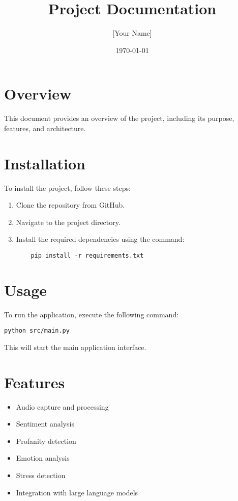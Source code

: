 \documentclass{article}
\title{Project Documentation}
\author{[Your Name]}
\date{\today}
\begin{document}
\maketitle

\section{Overview}
This document provides an overview of the project, including its purpose, features, and architecture.

\section{Installation}
To install the project, follow these steps:
\begin{enumerate}
    \item Clone the repository from GitHub.
    \item Navigate to the project directory.
    \item Install the required dependencies using the command:
    \begin{verbatim}
    pip install -r requirements.txt
    \end{verbatim}
\end{enumerate}

\section{Usage}
To run the application, execute the following command:
\begin{verbatim}
python src/main.py
\end{verbatim}
This will start the main application interface.

\section{Features}
\begin{itemize}
    \item Audio capture and processing
    \item Sentiment analysis
    \item Profanity detection
    \item Emotion analysis
    \item Stress detection
    \item Integration with large language models
\end{itemize}
\end{document}
